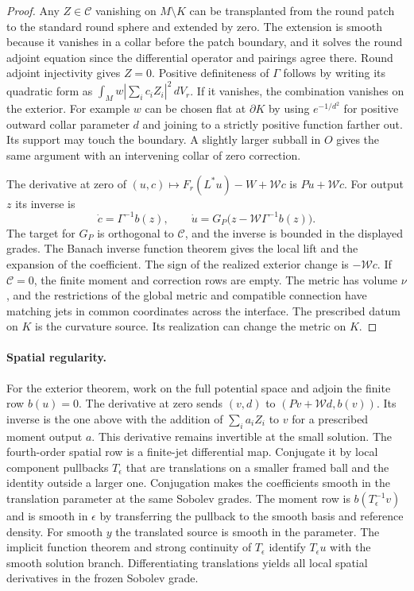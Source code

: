 \documentclass[11pt]{article}
\numberwithin{equation}{section}
\theoremstyle{definition}
\theoremstyle{remark}
\begin{document}
\begin{proof}
Any \(Z\in\mathcal C\) vanishing on \(M\setminus K\) can be
transplanted from the round patch to the standard round sphere
and extended by zero. The extension is smooth because it vanishes
in a collar before the patch boundary, and it solves the round
adjoint equation since the differential operator and pairings
agree there. Round adjoint injectivity gives \(Z=0\).
Positive definiteness of \(\Gamma\) follows by writing its quadratic
form as \(\int_M w|\sum_i c_i Z_i|^2\,dV_r\). If it vanishes,
the combination vanishes on the exterior. For example \(w\) can
be chosen flat at \(\partial K\) by using \(e^{-1/d^2}\) for
positive outward collar parameter \(d\) and joining to a strictly
positive function farther out. Its support may touch the boundary.
A slightly larger subball in \(O\) gives the same argument with an
intervening collar of zero correction.

The derivative at zero of
\((u,c)\mapsto F_r(L^*u)-W+\mathcal Wc\) is \(P\dot u+\mathcal W\dot c\).
For output \(z\) its inverse is
\[
 \dot c=\Gamma^{-1}b(z),\qquad
 \dot u=G_P\bigl(z-\mathcal W\Gamma^{-1}b(z)\bigr).
\]
The target for \(G_P\) is orthogonal to \(\mathcal C\), and the
inverse is bounded in the displayed grades. The Banach inverse
function theorem gives the local lift and the expansion of the
coefficient. The sign of the realized exterior change is
\(-\mathcal Wc\). If \(\mathcal C=0\), the finite moment and correction
rows are empty. The metric has volume \(\nu\), and the restrictions
of the global metric and compatible connection have matching jets
in common coordinates across the interface. The prescribed datum
on \(K\) is the curvature source. Its realization can change the
metric on \(K\).
\end{proof}

\paragraph{Spatial regularity.}
For the exterior theorem, work on the full potential space and
adjoin the finite row \(b(u)=0\). The derivative at zero sends
\((v,d)\) to \((Pv+\mathcal Wd,b(v))\). Its inverse is the one
above with the addition of \(\sum_i a_i Z_i\) to \(v\) for a
prescribed moment output \(a\). This derivative remains invertible
at the small solution. The fourth-order spatial row is a
finite-jet differential map. Conjugate it by local component
pullbacks \(T_\epsilon\) that are translations on a smaller
framed ball and the identity outside a larger one. Conjugation
makes the coefficients smooth in the translation parameter at
the same Sobolev grades. The moment row is \(b(T_\epsilon^{-1}v)\)
and is smooth in \(\epsilon\) by transferring the pullback to
the smooth basis and reference density. For smooth \(y\) the translated
source is smooth in the parameter. The implicit function theorem
and strong continuity of \(T_\epsilon\) identify \(T_\epsilon u\)
with the smooth solution branch. Differentiating translations yields
all local spatial derivatives in the frozen Sobolev grade.
\end{document}
